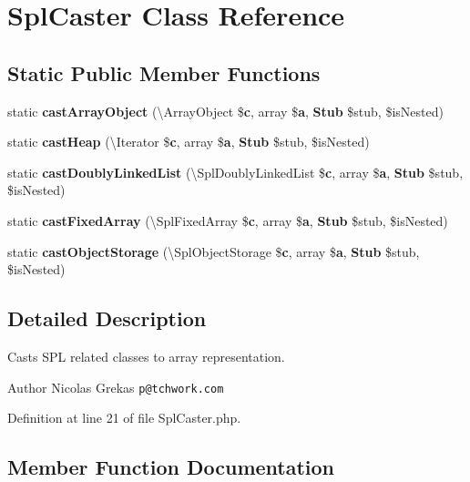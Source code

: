 \section{Spl\+Caster Class Reference}
\label{class_symfony_1_1_component_1_1_var_dumper_1_1_caster_1_1_spl_caster}
\subsection*{Static Public Member Functions}
\begin{DoxyCompactItemize}
\item 
static {\bf cast\+Array\+Object} (\textbackslash{}Array\+Object \${\bf c}, array \${\bf a}, {\bf Stub} \$stub, \$is\+Nested)
\item 
static {\bf cast\+Heap} (\textbackslash{}Iterator \${\bf c}, array \${\bf a}, {\bf Stub} \$stub, \$is\+Nested)
\item 
static {\bf cast\+Doubly\+Linked\+List} (\textbackslash{}Spl\+Doubly\+Linked\+List \${\bf c}, array \${\bf a}, {\bf Stub} \$stub, \$is\+Nested)
\item 
static {\bf cast\+Fixed\+Array} (\textbackslash{}Spl\+Fixed\+Array \${\bf c}, array \${\bf a}, {\bf Stub} \$stub, \$is\+Nested)
\item 
static {\bf cast\+Object\+Storage} (\textbackslash{}Spl\+Object\+Storage \${\bf c}, array \${\bf a}, {\bf Stub} \$stub, \$is\+Nested)
\end{DoxyCompactItemize}


\subsection{Detailed Description}
Casts S\+P\+L related classes to array representation.

\begin{DoxyAuthor}{Author}
Nicolas Grekas {\tt p@tchwork.\+com} 
\end{DoxyAuthor}


Definition at line 21 of file Spl\+Caster.\+php.



\subsection{Member Function Documentation}
